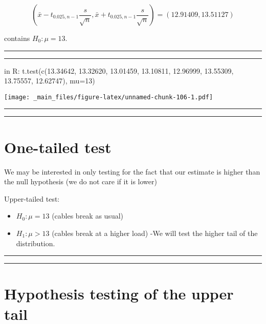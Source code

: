 \documentclass[
]{book}
\providecommand{\tightlist}{%
  \setlength{\itemsep}{0pt}\setlength{\parskip}{0pt}}
\begin{document}
\[(\bar{x}-t_{0.025, n-1} \frac{s}{\sqrt{n}}, \bar{x}+t_{0.025, n-1} \frac{s}{\sqrt{n}})=(12.91409, 13.51127)\]

contains \(H_0:\mu=13\).

\begin{center}\rule{0.5\linewidth}{0.5pt}\end{center}

\begin{center}\rule{0.5\linewidth}{0.5pt}\end{center}

in R:
t.test(c(13.34642, 13.32620, 13.01459, 13.10811,
12.96999, 13.55309, 13.75557, 12.62747), mu=13)

\texttt{[image: \_main\_files/figure-latex/unnamed-chunk-106-1.pdf]}

\begin{center}\rule{0.5\linewidth}{0.5pt}\end{center}

\begin{center}\rule{0.5\linewidth}{0.5pt}\end{center}

\hypertarget{one-tailed-test}{%
\section{One-tailed test}\label{one-tailed-test}}

We may be interested in only testing for the fact that our estimate is higher than the null hypothesis (we do not care if it is lower)

Upper-tailed test:

\begin{itemize}
\tightlist
\item
  \(H_0:\mu = 13\) (cables break as usual)
\item
  \(H_1:\mu > 13\) (cables break at a higher load) -We will test the higher tail of the distribution.
\end{itemize}

\begin{center}\rule{0.5\linewidth}{0.5pt}\end{center}

\begin{center}\rule{0.5\linewidth}{0.5pt}\end{center}

\hypertarget{hypothesis-testing-of-the-upper-tail}{%
\section{Hypothesis testing of the upper tail}\label{hypothesis-testing-of-the-upper-tail}}
\end{document}
